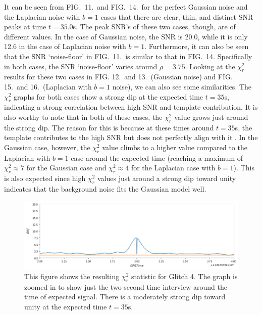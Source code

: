 \documentclass[preprint,
letterpaper,
 amsmath,amssymb,
 aps,
]{revtex4-2}
\begin{document}
It can be seen from FIG.\ 11.\ and FIG.\ 14.\ for the perfect Gaussian noise and the Laplacian noise with $b=1$ cases that there are clear, thin, and distinct SNR peaks at time $t = 35.0$s. The peak SNR's of these two cases, though, are of different values. In the case of Gaussian noise, the SNR is 20.0, while it is only 12.6 in the case of Laplacian noise with $b=1$. Furthermore, it can also be seen that the SNR `noise-floor' in FIG.\ 11.\ is similar to that in FIG.\ 14. Specifically in both cases, the SNR `noise-floor' varies around $\rho = 3.75$. Looking at the $\chi^2_r$ results for these two cases in FIG. 12.\ and 13.\ (Gaussian noise) and FIG. 15.\ and 16.\ (Laplacian with $b=1$ noise), we can also see some similarities. The $\chi^2_r$ graphs for both cases show a strong dip at the expected time $t=35$s, indicating a strong correlation between high SNR and template contribution. It is also worthy to note that in both of these cases, the $\chi^2_r$ value grows just around the strong dip. The reason for this is because at these times around $t=35$s, the template contributes to the high SNR but does not perfectly align with it \cite{collaboration2019open}. In the Gaussian case, however, the $\chi_r^2$ value climbs to a higher value compared to the Laplacian with $b=1$ case around the expected time (reaching a maximum of $\chi_r^2 \approx 7$ for the Gaussian case and $\chi_r^2\approx 4$ for the Laplacian case with $b=1$). This is also expected since high $\chi_r^2$ values just around a strong dip toward unity indicates that the background noise fits the Gaussian model well.

\begin{figure}
\includegraphics[width = .9\textwidth]{chi2 glitch 4.png}
\caption{This figure shows the resulting $\chi^2_r$ statistic for Glitch 4. The graph is zoomed in to show just the two-second time interview around the time of expected signal. There is a moderately strong dip toward unity at the expected time $t=35$s.}
\centering
\end{figure} 
\end{document}
